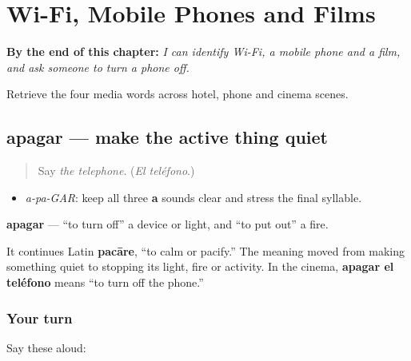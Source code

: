 
\chapter{Wi-Fi, Mobile Phones and Films}
\label{ch:wifi-movil-pelicula-apagar}

\begin{chapteropening}
\textbf{By the end of this chapter:} \emph{I can identify Wi-Fi, a mobile phone and a film, and ask someone to turn a phone off.}

Retrieve the four media words across hotel, phone and cinema scenes.
\end{chapteropening}

\section[apagar]{apagar — make the active thing quiet}

\label{lesson:ES-C404-apagar}



\begin{quote}
Say \emph{the telephone}. (\emph{El teléfono}.)
\end{quote}

\begin{sounds}
\begin{itemize}
\raggedright
  \item \emph{a-pa-GAR}: keep all three \textbf{a} sounds clear and stress the final syllable.
\end{itemize}
\end{sounds}

\begin{cousinweb}
\textbf{apagar} — “to turn off” a device or light, and “to put out” a fire.

It continues Latin \textbf{pacāre}, “to calm or pacify.” The meaning moved from making something quiet to stopping its light, fire or activity. In the cinema, \textbf{apagar el teléfono} means “to turn off the phone.”
\end{cousinweb}

\subsection*{Your turn}
Say these aloud:

